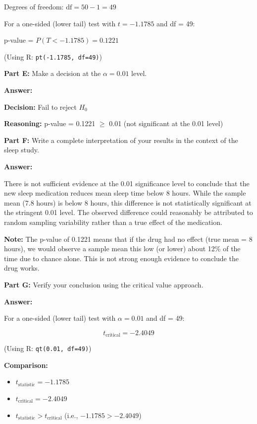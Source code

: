 \documentclass[11pt]{article}
\begin{document}
Degrees of freedom: $\text{df} = 50 - 1 = 49$

For a one-sided (lower tail) test with $t = -1.1785$ and df = 49:

p-value = $P(T < -1.1785) = 0.1221$

(Using R: \texttt{pt(-1.1785, df=49)})

\vspace{6pt}

\textbf{Part E:} Make a decision at the $\alpha = 0.01$ level.

\textcolor{answergreen}{\textbf{Answer:}}

\textbf{Decision:} Fail to reject $H_0$

\textbf{Reasoning:} p-value = 0.1221 $\geq$ 0.01 (not significant at the 0.01 level)

\vspace{6pt}

\textbf{Part F:} Write a complete interpretation of your results in the context of the sleep study.

\textcolor{answergreen}{\textbf{Answer:}}

There is not sufficient evidence at the 0.01 significance level to conclude that the new sleep medication reduces mean sleep time below 8 hours. While the sample mean (7.8 hours) is below 8 hours, this difference is not statistically significant at the stringent 0.01 level. The observed difference could reasonably be attributed to random sampling variability rather than a true effect of the medication.

\textbf{Note:} The p-value of 0.1221 means that if the drug had no effect (true mean = 8 hours), we would observe a sample mean this low (or lower) about 12\% of the time due to chance alone. This is not strong enough evidence to conclude the drug works.

\vspace{6pt}

\textbf{Part G:} Verify your conclusion using the critical value approach.

\textcolor{answergreen}{\textbf{Answer:}}

For a one-sided (lower tail) test with $\alpha = 0.01$ and df = 49:

$$t_{\text{critical}} = -2.4049$$

(Using R: \texttt{qt(0.01, df=49)})

\textbf{Comparison:}
\begin{itemize}
\item $t_{\text{statistic}} = -1.1785$
\item $t_{\text{critical}} = -2.4049$
\item $t_{\text{statistic}} > t_{\text{critical}}$ (i.e., $-1.1785 > -2.4049$)
\end{itemize}
\end{document}

